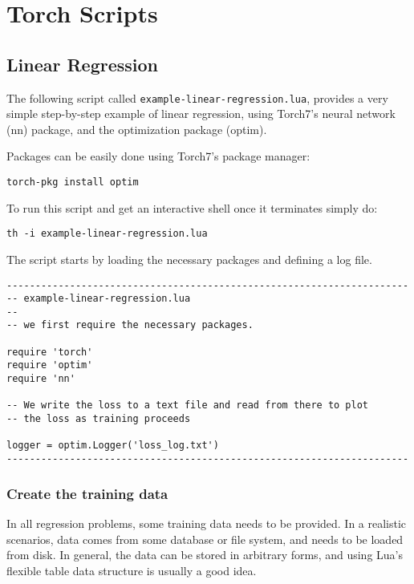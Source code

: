 \appendix

\chapter{Torch Scripts}
\label{chap:appendix}

\section{Linear Regression}
\label{app:linear_regression}

The following script called {\tt example-linear-regression.lua}, 
provides a very simple step-by-step example of
linear regression, using Torch7's neural network (nn) package,
and the optimization package (optim).

Packages can be easily done using Torch7's package manager:

{\tt torch-pkg install optim}

To run this script and get an interactive shell once it terminates simply do:

{\tt  th -i example-linear-regression.lua }

The script starts by loading the necessary packages and defining a log file.

\begin{verbatim}
----------------------------------------------------------------------
-- example-linear-regression.lua
-- 
-- we first require the necessary packages.

require 'torch'
require 'optim'
require 'nn'

-- We write the loss to a text file and read from there to plot 
-- the loss as training proceeds

logger = optim.Logger('loss_log.txt')
----------------------------------------------------------------------
\end{verbatim}

\subsection{Create the training data}

In all regression problems, some training data needs to be provided. 
In a realistic scenarios, data comes from some database
or file system, and needs to be loaded from disk. 
In general, the data can be stored in arbitrary forms, and using
Lua's flexible table data structure is usually a good idea. 

